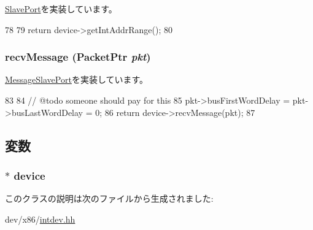 \hyperlink{classSlavePort_a6e967f8921e80748eb2be35b6b481a7e}{SlavePort}を実装しています。


\begin{DoxyCode}
78         {
79             return device->getIntAddrRange();
80         }
\end{DoxyCode}
\hypertarget{classX86ISA_1_1IntDevice_1_1IntSlavePort_a3dad3b561a1022eee5fab74df92ce766}{
\subsubsection[{recvMessage}]{ recvMessage ({\bf PacketPtr} {\em pkt})}}
\label{classX86ISA_1_1IntDevice_1_1IntSlavePort_a3dad3b561a1022eee5fab74df92ce766}


\hyperlink{classMessageSlavePort_aa3b469f80ff640585c37fae6064062a3}{MessageSlavePort}を実装しています。


\begin{DoxyCode}
83         {
84             // @todo someone should pay for this
85             pkt->busFirstWordDelay = pkt->busLastWordDelay = 0;
86             return device->recvMessage(pkt);
87         }
\end{DoxyCode}


\subsection{変数}
\hypertarget{classX86ISA_1_1IntDevice_1_1IntSlavePort_a213401fbaf58b821f38f6e274ddafadc}{
\subsubsection[{device}]{$\ast$ {\bf device}}}
\label{classX86ISA_1_1IntDevice_1_1IntSlavePort_a213401fbaf58b821f38f6e274ddafadc}


このクラスの説明は次のファイルから生成されました:\begin{DoxyCompactItemize}
\item 
dev/x86/\hyperlink{intdev_8hh}{intdev.hh}\end{DoxyCompactItemize}
